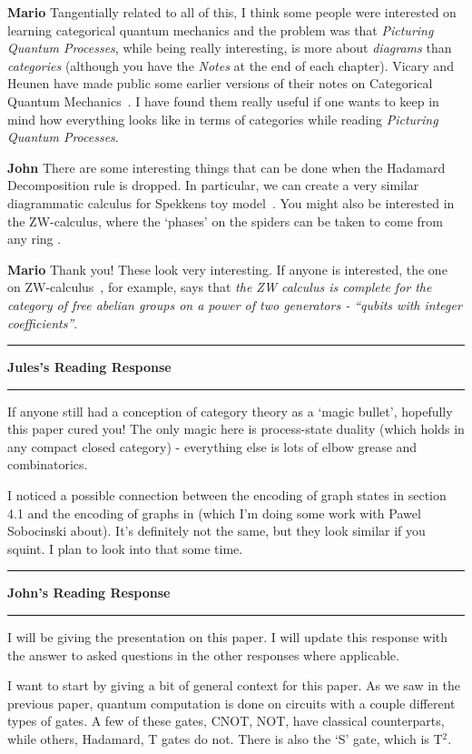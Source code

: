 \documentclass{amsart}
\newcommand{\iam}[1]{
  \vspace{0.25em}
  \hrule
  \vspace{0.25em}
  \textbf{{#1}'s Reading Response}
  \vspace{0.25em}
  \hrule
  \vspace{1em}
}
\newcommand{\respond}[1]{
  \vspace{1em} \textbf{#1}
}
\begin{document}
\respond{Mario} Tangentially related to all of this, I think some
people were interested on learning categorical quantum mechanics and
the problem was that \emph{Picturing Quantum Processes}, while being
really interesting, is more about \emph{diagrams} than
\emph{categories} (although you have the \emph{Notes} at the end of
each chapter).  Vicary and Heunen have made public some earlier
versions of their notes on Categorical Quantum
Mechanics~\cite{HeunenVicaryNotes}. I have found them really useful if
one wants to keep in mind how everything looks like in terms of
categories while reading \emph{Picturing Quantum Processes}.

\respond{John} There are some interesting things that can be done when the Hadamard Decomposition rule is dropped. In particular, we can create a very similar diagrammatic calculus for Spekkens toy model~\cite{SpekkensCompleteness}. You might also be interested in the ZW-calculus, where the `phases' on the spiders can be taken to come from any ring \cite{AmarZW}.

\respond{Mario} Thank you! These look very interesting. If anyone is
interested, the one on ZW-calculus~\cite{AmarZW}, for example, says
that \emph{the ZW calculus is complete for the category of free
  abelian groups on a power of two generators - “qubits with integer
  coefficients”}.


\iam{Jules} If anyone still had a conception of category theory as a `magic bullet', hopefully this paper cured you! The only magic here is process-state duality (which holds in any compact closed category) - everything else is lots of elbow grease and combinatorics.

I noticed a possible connection between the encoding of graph states in section 4.1 and the encoding of graphs in \cite{PawelCompGT} (which I'm doing some work with Pawel Sobocinski about). It's definitely not the same, but they look similar if you squint. I plan to look into that some time.


\iam{John}
I will be giving the presentation on this paper. I will update this response with the answer to asked questions in the other responses where applicable.

I want to start by giving a bit of general context for this paper. As we saw in the previous paper, quantum computation is done on circuits with a couple different types of gates. A few of these gates, CNOT, NOT, have classical counterparts, while others, Hadamard, T gates do not. There is also the `S' gate, which is T$^2$.
\end{document}
